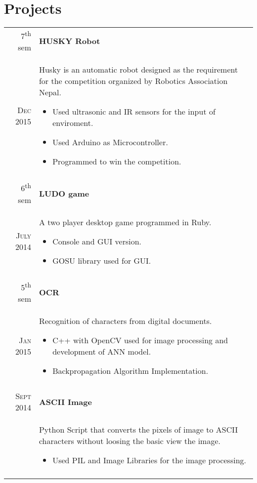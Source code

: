 \documentclass[a4paper,10pt]{article}
\begin{document}
\section{Projects}
\begin{tabular}{r|p{11cm}}
7\textsuperscript{th} sem & \textbf{HUSKY Robot}\\ \textsc{Dec 2015} & \small{Husky is an automatic robot designed as the requirement for the competition organized by Robotics Association Nepal.
\footnotesize{
\begin{itemize}
\item Used ultrasonic and IR sensors for the input of enviroment.
\item Used Arduino as Microcontroller.
\item Programmed to win the competition.
\end{itemize}
}}\\\multicolumn{2}{c}{} \\

6\textsuperscript{th} sem & \textbf{LUDO game}\\ \textsc{July 2014} & \small{A two player desktop game programmed in Ruby.
\footnotesize{
\begin{itemize}
\item Console and GUI version.
\item GOSU library used for GUI.
\end{itemize}
}}\\\multicolumn{2}{c}{} \\

5\textsuperscript{th} sem & \textbf{OCR}\\ \textsc{Jan 2015} & \small{Recognition of characters from digital documents.
\footnotesize{
\begin{itemize}
\item C++ with OpenCV used for image processing and development of ANN model.
\item Backpropagation Algorithm Implementation.
\end{itemize}
}}\\\multicolumn{2}{c}{} \\

\textsc{Sept 2014}  & \textbf{ASCII Image}\\& \small{Python Script that converts the pixels of image to ASCII characters without loosing the basic view the image.
\footnotesize{
\begin{itemize}
\item Used PIL and Image Libraries for the image processing.
\end{itemize}
}}\\\multicolumn{2}{c}{} \\


\end{tabular}
\end{document}
